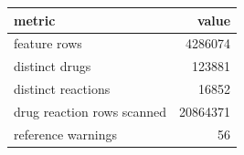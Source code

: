 \begin{tabular}{lr}
\toprule
metric & value \\
\midrule
feature rows & 4286074 \\
distinct drugs & 123881 \\
distinct reactions & 16852 \\
drug reaction rows scanned & 20864371 \\
reference warnings & 56 \\
\bottomrule
\end{tabular}
